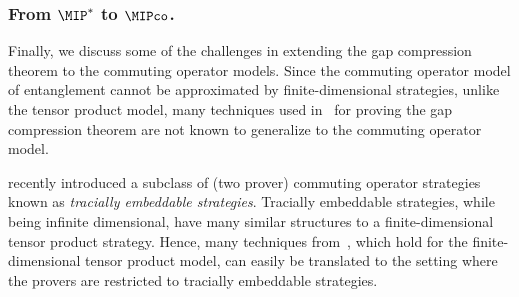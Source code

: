 \subsubsection{From $\MIP^*$ to $\MIPco$. } \label{sec:introMIPstartoMIPco}

Finally, we discuss some of the challenges in extending the gap compression theorem to the commuting operator models. Since the commuting operator model of entanglement cannot be approximated by finite-dimensional strategies, unlike the tensor product model, many techniques used in~\cite{jiMIPRE2022a} for proving the gap compression theorem are not known to generalize to the commuting operator model. 

\cite{linTracialEmbeddableStrategies2024} recently introduced a subclass of (two prover) commuting operator strategies known as \textit{tracially embeddable strategies}. Tracially embeddable strategies, while being infinite dimensional, have many similar structures to a finite-dimensional tensor product strategy. Hence, many techniques from~\cite{jiMIPRE2022a}, which hold for the finite-dimensional tensor product model, can easily be translated to the setting where the provers are restricted to tracially embeddable strategies.

